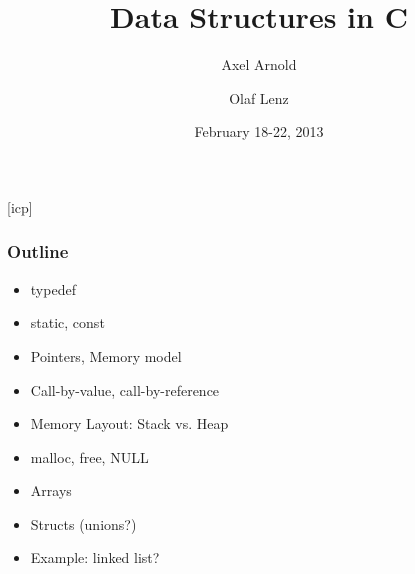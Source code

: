 \documentclass{slides}
\begin{document}
\graphicspath{{figures/}}

\title[Data Structures in C]{\Large Data Structures in C}

\author[A. Arnold and O. Lenz]{Axel Arnold \and Olaf Lenz} 
\date{February 18-22, 2013}

\begin{frame}
  \titlepage
\end {frame}
[icp]

\begin{frame}
  \frametitle{Outline}
  \begin{itemize}
  \item typedef
  \item static, const
  \item Pointers, Memory model
  \item Call-by-value, call-by-reference
  \item Memory Layout: Stack vs. Heap
  \item malloc, free, NULL
  \item Arrays
  \item Structs (unions?)
  \item Example: linked list?
  \end{itemize}
\end{frame}
\end{document}
